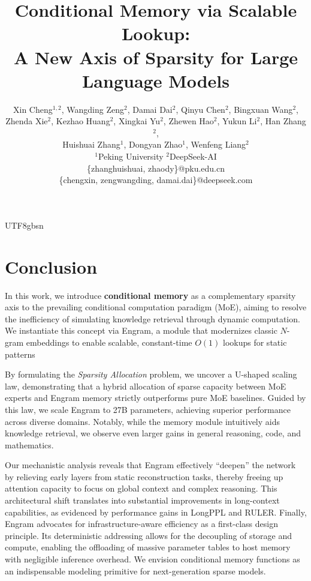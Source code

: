 \documentclass[11pt, a4paper, logo, copyright, nonumbering]{deepseek}
\title{
\centering Conditional Memory via Scalable Lookup: \\ A New Axis of Sparsity for Large Language Models
}
\author[]{
Xin Cheng$^{1,2}$, Wangding Zeng$^{2}$, Damai Dai$^{2}$, Qinyu Chen$^{2}$, Bingxuan Wang$^{2}$,

\vspace{-0.1in}
Zhenda Xie$^{2}$, Kezhao Huang$^{2}$, Xingkai Yu$^{2}$, Zhewen Hao$^{2}$, Yukun Li$^{2}$, Han Zhang$^{2}$,

\vspace{-0.1in}
Huishuai Zhang$^{1}$, Dongyan Zhao$^{1}$, Wenfeng Liang$^{2}$ \\
\vspace{-0.1in}
\small
$^1$Peking University  \quad $^2$DeepSeek-AI \\
\small
\{zhanghuishuai, zhaody\}@pku.edu.cn \\
\small 
\{chengxin, zengwangding, damai.dai\}@deepseek.com


\vspace{-0.2in}
}
\begin{document}
\begin{CJK*}{UTF8}{gbsn}

\maketitle










\section{Conclusion}

In this work, we introduce \textbf{conditional memory} as a complementary sparsity axis to the prevailing conditional computation paradigm (MoE), aiming to resolve the inefficiency of simulating knowledge retrieval through dynamic computation. We instantiate this concept via Engram, a module that modernizes classic $N$-gram embeddings to enable scalable, constant-time $O(1)$ lookups for static patterns

By formulating the \textit{Sparsity Allocation} problem, we uncover a U-shaped scaling law, demonstrating that a hybrid allocation of sparse capacity between MoE experts and Engram memory strictly outperforms pure MoE baselines. Guided by this law, we scale Engram to 27B parameters, achieving superior performance across diverse domains. Notably, while the memory module intuitively aids knowledge retrieval, we observe even larger gains in general reasoning, code, and mathematics.

Our mechanistic analysis reveals that Engram effectively ``deepen'' the network by relieving early layers from static reconstruction tasks, thereby freeing up attention capacity to focus on global context and complex reasoning. This architectural shift translates into substantial improvements in long-context capabilities, as evidenced by performance gains in LongPPL and RULER. Finally, Engram advocates for infrastructure-aware efficiency as a first-class design principle. Its deterministic addressing allows for the decoupling of storage and compute, enabling the offloading of massive parameter tables to host memory with negligible inference overhead. We envision conditional memory functions as an indispensable modeling primitive for next-generation sparse models.




\end{CJK*}
\end{document}
